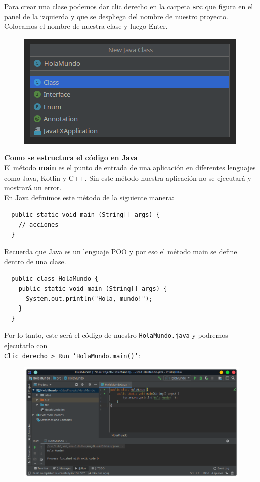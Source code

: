 \documentclass{article}
\begin{document}
Para crear una clase podemos dar clic derecho en la carpeta \textbf{src} que
figura en el panel de la izquierda y que se despliega del nombre de nuestro
proyecto. Colocamos el nombre de nuestra clase y luego Enter.\\

\begin{figure}[h!]
  \centering
  \includegraphics[scale=0.75]{./Pictures/034_new_class.png}
\end{figure}

\textbf{Como se estructura el código en Java}\\

El método \textbf{main} es el punto de entrada de una aplicación en diferentes
lenguajes como Java, Kotlin y C++. Sin este método nuestra aplicación no se
ejecutará y mostrará un error.\\

En Java definimos este método de la siguiente manera:

\begin{verbatim}
  public static void main (String[] args) {
    // acciones
  }
\end{verbatim}

Recuerda que Java es un lenguaje POO y por eso el método main se define dentro de una clase.

\begin{verbatim}
  public class HolaMundo {
    public static void main (String[] args) {
      System.out.println("Hola, mundo!");
    }
  }
\end{verbatim}

Por lo tanto, este será el código de nuestro \texttt{HolaMundo.java} y podremos
ejecutarlo con\\
\texttt{Clic derecho > Run 'HolaMundo.main()'}:

\begin{figure}[h!]
  \centering
  \includegraphics[scale=0.73]{./Pictures/002_IntelliJ_Idea.png}
\end{figure}
\end{document}
